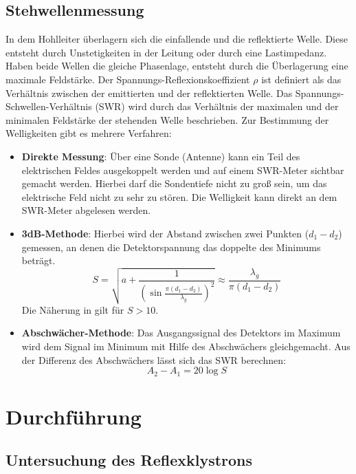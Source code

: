 \subsection{Stehwellenmessung}
In dem Hohlleiter überlagern sich die einfallende und die reflektierte Welle.
Diese entsteht durch Unstetigkeiten in der Leitung oder durch eine Lastimpedanz.
Haben beide Wellen die gleiche Phasenlage, entsteht durch die Überlagerung eine
maximale Feldstärke.
Der Spannungs-Reflexionskoeffizient $\rho$ ist definiert als das Verhältnis
zwischen der emittierten und der reflektierten Welle.
Das Spannungs-Schwellen-Verhältnis (SWR) wird durch das Verhältnis der
maximalen und der minimalen Feldstärke der stehenden Welle beschrieben.
Zur Bestimmung der Welligkeiten gibt es mehrere Verfahren:
\begin{itemize}
  \item \textbf{Direkte Messung}: Über eine Sonde (Antenne) kann ein Teil des
  elektrischen Feldes ausgekoppelt werden und auf einem SWR-Meter sichtbar
  gemacht werden. Hierbei darf die Sondentiefe nicht zu groß sein, um das
  elektrische Feld nicht zu sehr zu stören. Die Welligkeit kann direkt an
  dem SWR-Meter abgelesen werden.
  \item \textbf{3dB-Methode}: Hierbei wird der Abstand zwischen zwei Punkten ($d_1-d_2$)
  gemessen, an denen die Detektorspannung das doppelte des Minimums beträgt.
  \begin{equation}
    S= \sqrt{a+\frac{1}{\left(\sin{\frac{\pi(d_1-d_2)}{\lambda_g}}\right)^2}}
    \approx \frac{\lambda_g}{\pi (d_1-d_2)}
  \end{equation}
  Die Näherung in gilt für $S>10$.
  \item \textbf{Abschwächer-Methode}: Das Ausgangssignal des Detektors im Maximum
  wird dem Signal im Minimum mit Hilfe des Abschwächers gleichgemacht. Aus der
  Differenz des Abschwächers lässt sich das SWR berechnen:
  \begin{equation}
    A_2-A_1 = 20 \log{S}
  \end{equation}
\end{itemize}

\section{Durchführung}

\subsection{Untersuchung des Reflexklystrons}

